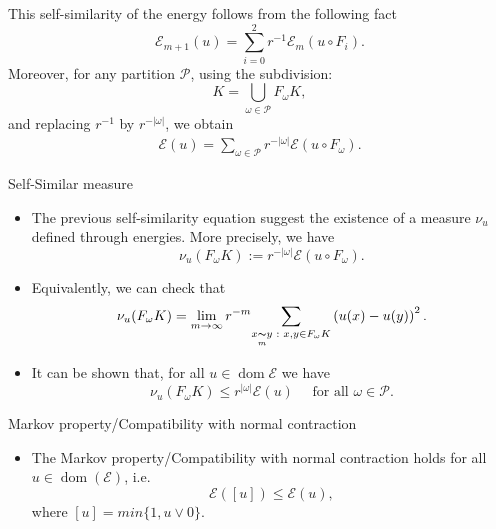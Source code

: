 \begin{frame}
This self-similarity of the energy follows from the following fact
$$
\mathcal{E}_{m+1}(u)=\sum_{i=0}^{2} r^{-1} \mathcal{E}_m\left(u \circ F_i\right).
$$
Moreover, for any partition $\mathcal{P}$, using the subdivision:
\begin{equation}
    K=\underset{\omega \in \mathcal{P}}{\bigcup}F_{\omega}K,
\end{equation}
and replacing $r^{-1}$ by $r^{-|\omega|}$, we obtain
\begin{align}\label{self-sim energy}
    \mathcal{E}(u)=\sum_{\omega\in \mathcal{P}} r^{-|\omega|} \mathcal{E}\left(u \circ F_{\omega}\right).
\end{align}
\end{frame}
\begin{frame}{Self-Similar measure}
\begin{itemize}
    \item The previous self-similarity equation suggest the existence of a measure $\nu_u$ defined through energies. More precisely, we have
    $$
    \nu_u\left(F_{\omega} K\right):=r^{-|\omega|} \mathcal{E}\left(u \circ F_{\omega}\right).
    $$
    \item Equivalently, we can check that 
    $$
    \nu_{u}(F_{\omega}K)=\lim_{m\rightarrow \infty}r^{-m}\underset{x \underset{m}{\thicksim} y\,\,:\,\,x,y\in F_{\omega}K}{\sum}\left(u(x)-u(y)\right)^{2}.
    $$
    \item It can be shown that, for all $u\in \operatorname{dom} \mathcal{E}$ we have 
    $$
    \nu_{u}\left(F_{\omega}K\right)\leq r^{|\omega|}\mathcal{E}(u)\quad \text{ for all } \omega \in \mathcal{P} .
    $$
\end{itemize}
\end{frame}
\begin{frame}{Markov property/Compatibility with normal contraction}
    \begin{itemize}
    \item The {Markov property/Compatibility with normal contraction} holds for all $u\in \operatorname{dom}(\mathcal{E})$, i.e.
    $$
    \mathcal{E}([u])\leq \mathcal{E}(u), 
    $$
    where $[u]=min\{1, u\vee 0\}$.
    \end{itemize}
\end{frame}
